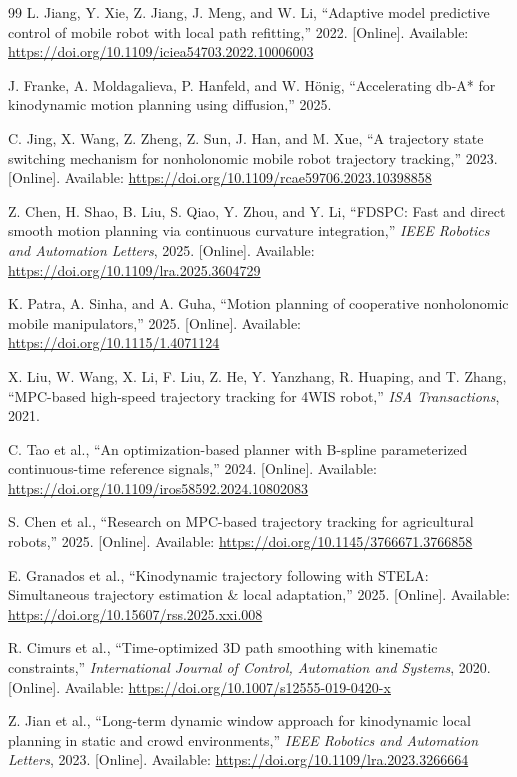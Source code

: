 \begin{thebibliography}{99}
L. Jiang, Y. Xie, Z. Jiang, J. Meng, and W. Li, ``Adaptive model predictive control of mobile robot with local path refitting,'' 2022. [Online]. Available: \url{https://doi.org/10.1109/iciea54703.2022.10006003}

J. Franke, A. Moldagalieva, P. Hanfeld, and W. Hönig, ``Accelerating db-A* for kinodynamic motion planning using diffusion,'' 2025.

C. Jing, X. Wang, Z. Zheng, Z. Sun, J. Han, and M. Xue, ``A trajectory state switching mechanism for nonholonomic mobile robot trajectory tracking,'' 2023. [Online]. Available: \url{https://doi.org/10.1109/rcae59706.2023.10398858}

Z. Chen, H. Shao, B. Liu, S. Qiao, Y. Zhou, and Y. Li, ``FDSPC: Fast and direct smooth motion planning via continuous curvature integration,'' \emph{IEEE Robotics and Automation Letters}, 2025. [Online]. Available: \url{https://doi.org/10.1109/lra.2025.3604729}

K. Patra, A. Sinha, and A. Guha, ``Motion planning of cooperative nonholonomic mobile manipulators,'' 2025. [Online]. Available: \url{https://doi.org/10.1115/1.4071124}

X. Liu, W. Wang, X. Li, F. Liu, Z. He, Y. Yanzhang, R. Huaping, and T. Zhang, ``MPC-based high-speed trajectory tracking for 4WIS robot,'' \emph{ISA Transactions}, 2021.

C. Tao et al., ``An optimization-based planner with B-spline parameterized continuous-time reference signals,'' 2024. [Online]. Available: \url{https://doi.org/10.1109/iros58592.2024.10802083}

S. Chen et al., ``Research on MPC-based trajectory tracking for agricultural robots,'' 2025. [Online]. Available: \url{https://doi.org/10.1145/3766671.3766858}

E. Granados et al., ``Kinodynamic trajectory following with STELA: Simultaneous trajectory estimation \& local adaptation,'' 2025. [Online]. Available: \url{https://doi.org/10.15607/rss.2025.xxi.008}

R. Cimurs et al., ``Time-optimized 3D path smoothing with kinematic constraints,'' \emph{International Journal of Control, Automation and Systems}, 2020. [Online]. Available: \url{https://doi.org/10.1007/s12555-019-0420-x}

Z. Jian et al., ``Long-term dynamic window approach for kinodynamic local planning in static and crowd environments,'' \emph{IEEE Robotics and Automation Letters}, 2023. [Online]. Available: \url{https://doi.org/10.1109/lra.2023.3266664}


\end{thebibliography}

